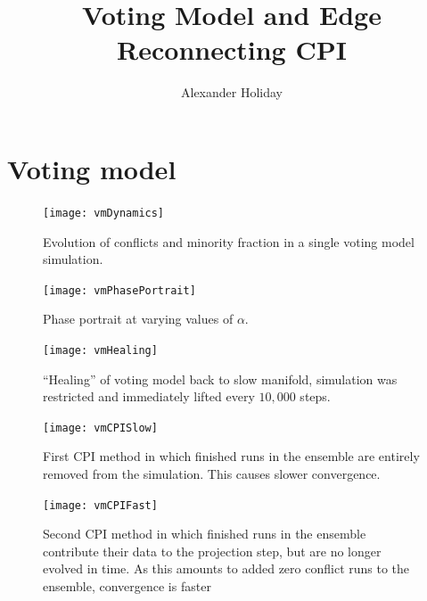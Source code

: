 \documentclass[11pt]{article}
\begin{document}
\title{\vspace{-5mm}Voting Model and Edge Reconnecting CPI}
\author{Alexander Holiday}
\maketitle
\section*{Voting model}
\begin{figure}
  \centering
  \texttt{[image: vmDynamics]}
  \caption{Evolution of conflicts and minority fraction in a single voting model simulation.}
  \label{fig:vmDynamics}
\end{figure}

\begin{figure}
  \centering
  \texttt{[image: vmPhasePortrait]}
  \caption{Phase portrait at varying values of $\alpha$.}
  \label{fig:vmPP}
\end{figure}

\begin{figure}
  \centering
  \texttt{[image: vmHealing]}
  \caption{``Healing'' of voting model back to slow manifold, simulation was restricted and immediately lifted every $10,000$ steps.}
  \label{fig:vmHealing}
\end{figure}

\begin{figure}
  \centering
  \texttt{[image: vmCPISlow]}
  \caption{First CPI method in which finished runs in the ensemble are entirely removed from the simulation. This causes slower convergence.}
  \label{fig:vmSlow}
\end{figure}

\begin{figure}
  \centering
  \texttt{[image: vmCPIFast]}
  \caption{Second CPI method in which finished runs in the ensemble contribute their data to the projection step, but are no longer evolved in time. As this amounts to added zero conflict runs to the ensemble, convergence is faster}
  \label{fig:vmSlow}
\end{figure}
\end{document}
